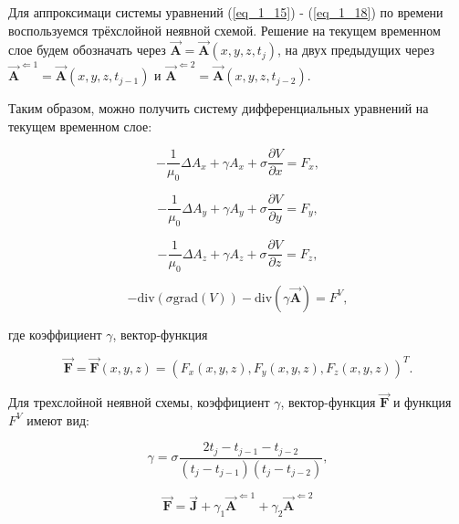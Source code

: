 Для аппроксимаци системы уравнений  (\ref{eq_1_15}) - (\ref{eq_1_18}) по времени воспользуемся трёхслойной неявной схемой. Решение на текущем временном слое будем обозначать через $\overrightarrow{\textbf{A}} = \overrightarrow{\textbf{A}}(x, y, z, t_j)$, на двух предыдущих через $\overrightarrow{\textbf{A}}^{\Leftarrow 1} = \overrightarrow{\textbf{A}}(x, y, z, t_{j-1})$ и $\overrightarrow{\textbf{A}}^{\Leftarrow 2} = \overrightarrow{\textbf{A}}(x, y, z, t_{j-2})$.

Таким образом, можно получить систему дифференциальных уравнений на текущем временном слое:

\begin{equation} \label{eq_1_19}
	-\frac{1}{\mu_0} \Delta A_x + \gamma A_x + \sigma \frac{\partial V}{\partial x} = F_x,
\end{equation}

\begin{equation} \label{eq_1_20}
	-\frac{1}{\mu_0} \Delta A_y + \gamma A_y + \sigma \frac{\partial V}{\partial y} = F_y,
\end{equation}

\begin{equation} \label{eq_1_21}
	-\frac{1}{\mu_0} \Delta A_z + \gamma A_z + \sigma \frac{\partial V}{\partial z}= F_z,
\end{equation}

\begin{equation} \label{eq_1_22}
	-\text{div}(\sigma \text{grad}(V)) - \text{div}(\gamma \overrightarrow{\textbf{A}}) = F^V,
\end{equation}

где коэффициент $\gamma$, вектор-функция

\begin{equation*}
	\overrightarrow{\textbf{F}} = \overrightarrow{\textbf{F}}(x, y, z) = \left(F_x(x, y, z), F_y(x, y, z), F_z(x, y, z)\right)^T.
\end{equation*}

Для трехслойной неявной схемы, коэффициент $\gamma$, вектор-функция $\overrightarrow{\textbf{F}}$ и функция $F^V$ имеют вид:

\begin{equation} \label{eq_1_23}
	\gamma = \sigma \frac{2t_j - t_{j - 1} - t_{j - 2}}{(t_j - t_{j - 1})(t_{j} - t_{j - 2})},
\end{equation}

\begin{equation} \label{eq_1_24}
	\overrightarrow{\textbf{F}} = \overrightarrow{\textbf{J}} + \gamma_1 \overrightarrow{\textbf{A}}^{\Leftarrow 1} + \gamma_2 \overrightarrow{\textbf{A}}^{\Leftarrow 2}
\end{equation}


